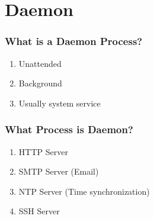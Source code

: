 \section{Daemon}

\begin{frame}
    \frametitle{What is a Daemon Process?}

    \begin{enumerate}
        \item Unattended
        \item Background
        \item Usually system service
    \end{enumerate}


\end{frame}

\begin{frame}
    \frametitle{What Process is Daemon?}

    \begin{enumerate}
        \item HTTP Server
        \item SMTP Server (Email)
        \item NTP Server (Time synchronization)
        \item SSH Server
    \end{enumerate}


\end{frame}
